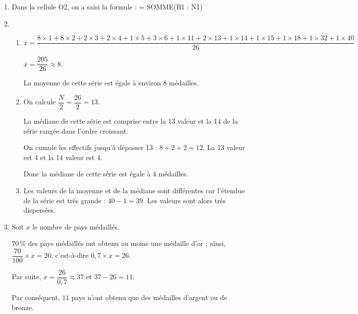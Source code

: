 \documentclass[10pt]{article}
\begin{document}
\begin{enumerate}
\item Dans la cellule O2, on a saisi la formule : = SOMME(B1 : N1)   
\item 
	\begin{enumerate}
	\item $\overline{x} = \dfrac{8\times 1 + 8\times 2 + 2 \times 3 + 2 \times 4 + 1 \times 5 + 3 \times 6 + 1\times 11 + 2 \times 13 + 1\times 14 + 1 \times 15 + 1 \times 18 + 1\times 32 + 1 \times 40}{26}$
	
$\overline{x} = \dfrac{205}{26} \approx  8$. 

La moyenne de cette série est égale à environ 8 médailles.

	\item On calcule $\dfrac{N}{2}= \dfrac{26}{2} = 13$. 
	
La médiane de cette série est comprise entre la 13 valeur et la 
  14 de la série rangée dans l’ordre croissant.
  
On cumule les effectifs jusqu’à dépasser 13 :  $8 + 2 + 2= 12$. La 13 valeur est 4 et la 14 valeur est 4.

Donc la médiane de cette série est égale à 4 médailles.
	\item Les valeurs de la moyenne et de la médiane sont différentes car l’étendue de la série est très grande : $40 - 1 = 39$. Les valeurs sont alors très dispersées.
		\end{enumerate}
\item  Soit $x$ le nombre de pays médaillés.

70\,\% des pays médaillés ont obtenu au moins une médaille d’or ; ainsi, $\dfrac{70}{100} \times x = 26$, c'est-à-dire $0,7\times x = 26$.

Par suite, $x = \dfrac{26}{0,7} \approx 37$ et $37 - 26 =11$.

Par conséquent, $11$ pays n’ont obtenu que des médailles d’argent ou de bronze.
\end{enumerate}
\end{document}
